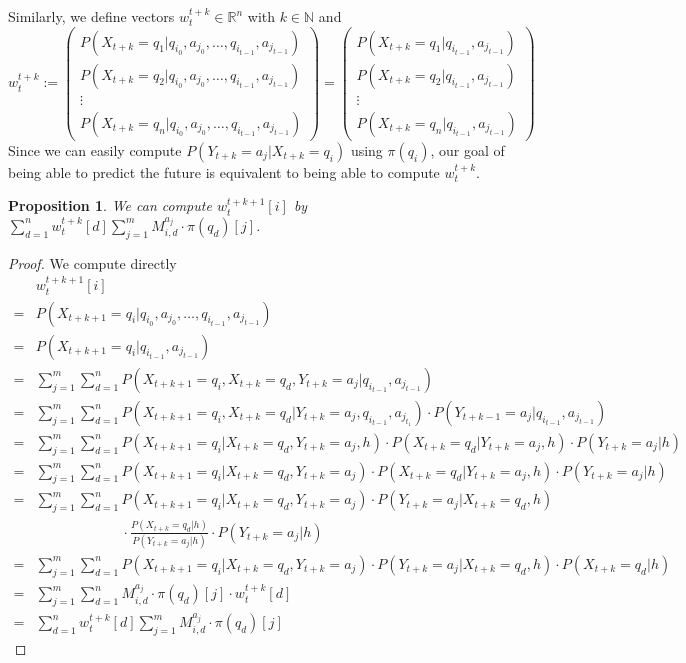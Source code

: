 \documentclass{article}
\newtheorem{prop}{Proposition}
\theoremstyle{definition}
\begin{document}
Similarly, we define vectors $w_t^{t+k} \in \mathbb{R}^{n}$ with $k\in \mathbb{N}$ and
\[
w_t^{t+k}:=
\left (
\begin{matrix}
P(X_{t+k}=q_1|q_{i_0},a_{j_0},\ldots,q_{i_{t-1}},a_{j_{t-1}}) \\
P(X_{t+k}=q_2|q_{i_0},a_{j_0},\ldots,q_{i_{t-1}},a_{j_{t-1}}) \\
\vdots \\
P(X_{t+k}=q_n|q_{i_0},a_{j_0},\ldots,q_{i_{t-1}},a_{j_{t-1}})
\end{matrix}
\right)
=
\left (
\begin{matrix}
P(X_{t+k}=q_1|q_{i_{t-1}},a_{j_{t-1}}) \\
P(X_{t+k}=q_2|q_{i_{t-1}},a_{j_{t-1}}) \\
\vdots \\
P(X_{t+k}=q_n|q_{i_{t-1}},a_{j_{t-1}})
\end{matrix}
\right )
\]
Since we can easily compute $P(Y_{t+k}=a_j|X_{t+k}=q_i)$ using $\pi(q_i)$, our goal of being able to predict the future is equivalent to being able to compute $w_t^{t+k}$.
\begin{prop}
We can compute $w_t^{t+k+1}[i]$ by $\sum\limits_{d=1}^{n} w_t^{t+k}[d] \sum\limits_{j=1}^{m} M^{a_j}_{i,d} \cdot \pi(q_d)[j]$.
\end{prop}
\begin{proof}
We compute directly
\begin{align*}
&w_t^{t+k+1}[i]\\
=&P(X_{t+k+1}=q_i|q_{i_0},a_{j_0},\ldots,q_{i_{t-1}},a_{j_{t-1}}) \\
=&P(X_{t+k+1}=q_i|q_{i_{t-1}},a_{j_{t-1}}) \\
=&\sum\limits_{j=1}^{m} \sum\limits_{d=1}^{n} P(X_{t+k+1}=q_i,X_{t+k}=q_d,Y_{t+k}=a_j|q_{i_{t-1}},a_{j_{t-1}}) \\
=&\sum\limits_{j=1}^{m} \sum\limits_{d=1}^{n} P(X_{t+k+1}=q_i,X_{t+k}=q_d|Y_{t+k}=a_j,q_{i_{t-1}},a_{j_{t_1}})\cdot P(Y_{t+k-1}=a_j|q_{i_{t-1}},a_{j_{t-1}}) \\
=&\sum\limits_{j=1}^{m} \sum\limits_{d=1}^{n} P(X_{t+k+1}=q_i|X_{t+k}=q_d,Y_{t+k}=a_j,h)\cdot P(X_{t+k}=q_d|Y_{t+k}=a_j,h)\cdot P(Y_{t+k}=a_j|h) \\
=&\sum\limits_{j=1}^{m} \sum\limits_{d=1}^{n} P(X_{t+k+1}=q_i|X_{t+k}=q_d,Y_{t+k}=a_j)\cdot P(X_{t+k}=q_d|Y_{t+k}=a_j,h)\cdot P(Y_{t+k}=a_j|h) \\
=&\sum\limits_{j=1}^{m} \sum\limits_{d=1}^{n}  P(X_{t+k+1}=q_i|X_{t+k}=q_d,Y_{t+k}=a_j)\cdot P(Y_{t+k}=a_j|X_{t+k}=q_d,h)\\
   & \phantom{\sum\limits_{j=1}^{m} \sum\limits_{d=1}^{n}}\cdot \frac{P(X_{t+k}=q_d|h)}{P(Y_{t+k}=a_j|h)} \cdot P(Y_{t+k}=a_j|h)\\
=&\sum\limits_{j=1}^{m} \sum\limits_{d=1}^{n} P(X_{t+k+1}=q_i|X_{t+k}=q_d,Y_{t+k}=a_j)\cdot P(Y_{t+k}=a_j|X_{t+k}=q_d,h)\cdot P(X_{t+k}=q_d|h) \\
=&\sum\limits_{j=1}^{m} \sum\limits_{d=1}^{n} M^{a_j}_{i,d} \cdot \pi(q_d)[j]\cdot w_t^{t+k}[d] \\
=&\sum\limits_{d=1}^{n} w_t^{t+k}[d] \sum\limits_{j=1}^{m} M^{a_j}_{i,d} \cdot \pi(q_d)[j]
\end{align*}
\end{proof}
\end{document}
